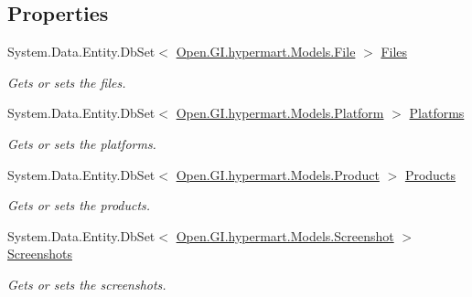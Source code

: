 \subsection*{Properties}
\begin{DoxyCompactItemize}
\item 
System.\+Data.\+Entity.\+Db\+Set$<$ \hyperlink{class_open_1_1_g_i_1_1hypermart_1_1_models_1_1_file}{Open.\+G\+I.\+hypermart.\+Models.\+File} $>$ \hyperlink{interface_open_1_1_g_i_1_1hypermart_1_1_d_a_l_1_1_i_hypermart_context_ad55483dd70d49187d4ef3fc2f33eeed5}{Files}
\begin{DoxyCompactList}\small\item\em Gets or sets the files. \end{DoxyCompactList}\item 
System.\+Data.\+Entity.\+Db\+Set$<$ \hyperlink{class_open_1_1_g_i_1_1hypermart_1_1_models_1_1_platform}{Open.\+G\+I.\+hypermart.\+Models.\+Platform} $>$ \hyperlink{interface_open_1_1_g_i_1_1hypermart_1_1_d_a_l_1_1_i_hypermart_context_a580b33089049ddd9288285d5b6207329}{Platforms}
\begin{DoxyCompactList}\small\item\em Gets or sets the platforms. \end{DoxyCompactList}\item 
System.\+Data.\+Entity.\+Db\+Set$<$ \hyperlink{class_open_1_1_g_i_1_1hypermart_1_1_models_1_1_product}{Open.\+G\+I.\+hypermart.\+Models.\+Product} $>$ \hyperlink{interface_open_1_1_g_i_1_1hypermart_1_1_d_a_l_1_1_i_hypermart_context_a173fd0de652e5d4a60803383c0046956}{Products}
\begin{DoxyCompactList}\small\item\em Gets or sets the products. \end{DoxyCompactList}\item 
System.\+Data.\+Entity.\+Db\+Set$<$ \hyperlink{class_open_1_1_g_i_1_1hypermart_1_1_models_1_1_screenshot}{Open.\+G\+I.\+hypermart.\+Models.\+Screenshot} $>$ \hyperlink{interface_open_1_1_g_i_1_1hypermart_1_1_d_a_l_1_1_i_hypermart_context_a2434b31b0324b19022883a71b1444494}{Screenshots}
\begin{DoxyCompactList}\small\item\em Gets or sets the screenshots. \end{DoxyCompactList}\end{DoxyCompactItemize}


